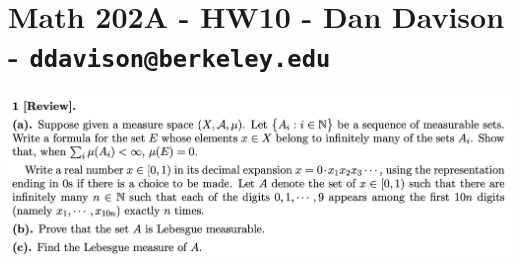 \section*{Math 202A - HW10 - Dan Davison - \texttt{ddavison@berkeley.edu}}

\begin{mdframed}
  \includegraphics[width=400pt]{img/analysis--berkeley-202a-hw10-7127.png}
\end{mdframed}

